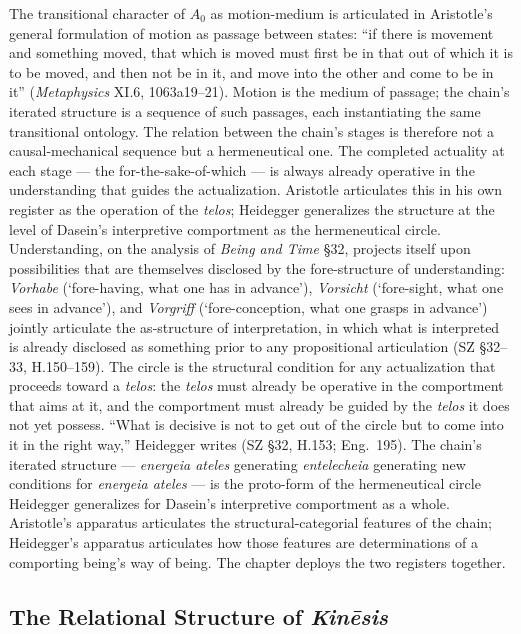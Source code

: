 The transitional character of $A_0$ as motion-medium is articulated in Aristotle's general formulation of motion as passage between states: ``if there is movement and something moved, that which is moved must first be in that out of which it is to be moved, and then not be in it, and move into the other and come to be in it'' (\textit{Metaphysics} XI.6, 1063a19--21). Motion is the medium of passage; the chain's iterated structure is a sequence of such passages, each instantiating the same transitional ontology. The relation between the chain's stages is therefore not a causal-mechanical sequence but a hermeneutical one. The completed actuality at each stage --- the for-the-sake-of-which --- is always already operative in the understanding that guides the actualization. Aristotle articulates this in his own register as the operation of the \textit{telos}; Heidegger generalizes the structure at the level of Dasein's interpretive comportment as the hermeneutical circle. Understanding, on the analysis of \textit{Being and Time} \S 32, projects itself upon possibilities that are themselves disclosed by the fore-structure of understanding: \textit{Vorhabe} (`fore-having, what one has in advance'), \textit{Vorsicht} (`fore-sight, what one sees in advance'), and \textit{Vorgriff} (`fore-conception, what one grasps in advance') jointly articulate the as-structure of interpretation, in which what is interpreted is already disclosed as something prior to any propositional articulation (SZ \S 32--33, H.150--159). The circle is the structural condition for any actualization that proceeds toward a \textit{telos}: the \textit{telos} must already be operative in the comportment that aims at it, and the comportment must already be guided by the \textit{telos} it does not yet possess. ``What is decisive is not to get out of the circle but to come into it in the right way,'' Heidegger writes (SZ \S 32, H.153; Eng.~195). The chain's iterated structure --- \textit{energeia ateles} generating \textit{entelecheia} generating new conditions for \textit{energeia ateles} --- is the proto-form of the hermeneutical circle Heidegger generalizes for Dasein's interpretive comportment as a whole. Aristotle's apparatus articulates the structural-categorial features of the chain; Heidegger's apparatus articulates how those features are determinations of a comporting being's way of being. The chapter deploys the two registers together.

\subsection{The Relational Structure of \textit{Kinēsis}}

